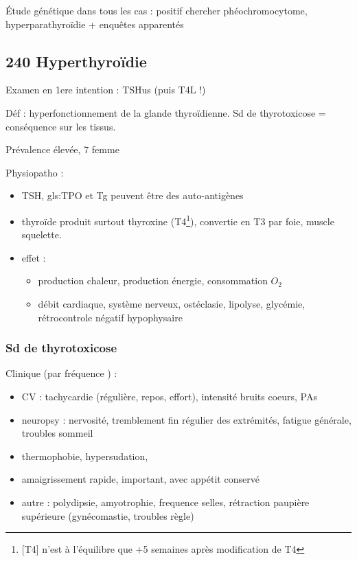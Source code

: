 \documentclass[11pt]{article}
\begin{document}
Étude génétique dans tous les cas : positif \thus chercher phéochromocytome,
hyperparathyroïdie + enquêtes apparentés
\subsection{240 \textdagger{} Hyperthyroïdie}
\label{sec:org168b72c}
\begin{tcolorbox}
Examen en 1ere intention : TSHus (puis T4L !)
\end{tcolorbox}

Déf : hyperfonctionnement de la glande thyroïdienne. Sd de thyrotoxicose =
conséquence sur les tissus.

Prévalence élevée, 7\texttimes{} femme

Physiopatho :
\begin{itemize}
\item TSH, gls:TPO et Tg peuvent être des auto-antigènes
\item thyroïde produit surtout thyroxine (T4\footnote{[T4] n'est à l'équilibre que +5 semaines après modification de T4}), convertie en T3 par foie, muscle
squelette.
\item effet : 
\begin{itemize}
\item \inc production chaleur, \inc production énergie, \inc consommation \(O_2\)
\item \inc débit cardiaque, système nerveux, \inc ostéclasie, \inc lipolyse, \inc
glycémie, rétrocontrole négatif hypophysaire
\end{itemize}
\end{itemize}

\subsubsection{Sd de thyrotoxicose}
\label{sec:orgda5217e}
Clinique (par fréquence \dec) :
\begin{itemize}
\item CV : tachycardie (régulière, repos, \inc effort), \inc intensité bruits
coeurs, \inc PAs
\item neuropsy : nervosité, tremblement fin régulier des extrémités, fatigue
générale, troubles sommeil
\item thermophobie, hypersudation,
\item amaigrissement rapide, important, avec appétit conservé
\item autre : polydipsie, amyotrophie, \inc frequence selles, rétraction paupière
supérieure (gynécomastie, troubles règle)
\end{itemize}
\end{document}
